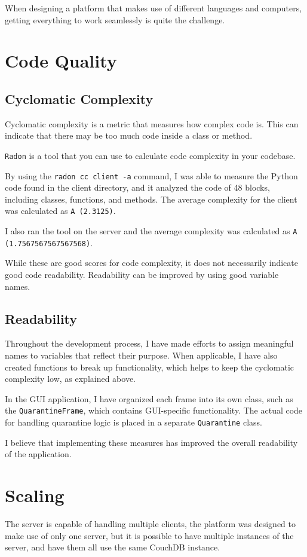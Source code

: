 When designing a platform that makes use of different languages and computers, getting everything to work seamlessly is quite the challenge.

\section{Code Quality}
\subsection{Cyclomatic Complexity}
Cyclomatic complexity is a metric that measures how complex code is.
This can indicate that there may be too much code inside a class or method.

\texttt{Radon} is a tool that you can use to
calculate code complexity in your codebase.

By using the \texttt{radon cc client -a} command,
I was able to measure the Python code found in the client directory,
and it analyzed the code of 48 blocks,
including classes, functions, and methods.
The average complexity for the client was calculated as \texttt{A (2.3125)}.

I also ran the tool on the server and the average complexity
was calculated as \texttt{A (1.7567567567567568)}.

While these are good scores for code complexity,
it does not necessarily indicate good code readability.
Readability can be improved by using good variable names.

\subsection{Readability}
Throughout the development process,
I have made efforts to assign meaningful names to variables that reflect their purpose.
When applicable, I have also created functions to break up functionality,
which helps to keep the cyclomatic complexity low, as explained above.

In the GUI application, I have organized each frame into its own class,
such as the \texttt{QuarantineFrame}, which contains GUI-specific functionality.
The actual code for handling quarantine logic is placed in a separate \texttt{Quarantine} class.

I believe that implementing these measures has improved
the overall readability of the application.

\section{Scaling}
The server is capable of handling multiple clients,
the platform was designed to make use of only one server,
but it is possible to have multiple instances of the server,
and have them all use the same CouchDB instance.

